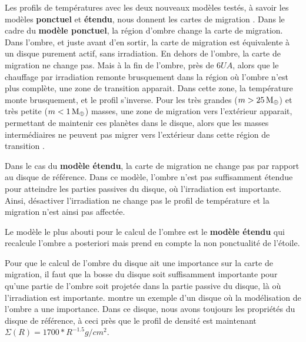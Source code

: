 Les profils de températures avec les deux nouveaux modèles testés, à savoir les modèles \textbf{ponctuel} et \textbf{étendu},
nous donnent les cartes de migration . Dans le cadre du \textbf{modèle ponctuel}, la région
d'ombre change la carte de migration. Dans l'ombre, et juste avant d'en sortir, la carte de migration est équivalente à un
disque purement actif, sans irradiation. En dehors de l'ombre, la carte de migration ne change pas. Mais à la fin de l'ombre,
près de $6\unit{UA}$, alors que le chauffage par irradiation remonte brusquement dans la région où l'ombre n'est plus
complète, une zone de transition apparait. Dans cette zone, la température monte brusquement, et le profil s'inverse. Pour les
très grandes ($m>25\mathrm{\thinspace M_\oplus}$) et très petite ($m<1\mathrm{\thinspace M_\oplus}$) masses, une zone de migration vers l'extérieur apparait, permettant
de maintenir ces planètes dans le disque, alors que les masses intermédiaires ne peuvent pas migrer vers l'extérieur dans cette
région de transition . 

Dans le cas du \textbf{modèle étendu}, la carte de migration ne change pas par rapport au disque de référence. Dans ce modèle, l'ombre n'est pas suffisamment étendue pour atteindre les parties passives du disque, où l'irradiation est importante. Ainsi, désactiver l'irradiation ne change pas le profil de température et la migration n'est ainsi pas affectée. 

Le modèle le plus abouti pour le calcul de l'ombre est le \textbf{modèle étendu} qui recalcule l'ombre a posteriori mais prend en compte la non ponctualité de l'étoile. 

Pour que le calcul de l'ombre du disque ait une importance sur la carte de migration, il faut que la bosse du disque soit suffisamment importante pour qu'une partie de l'ombre soit projetée dans la partie passive du disque, là où l'irradiation est importante.  montre un exemple d'un disque où la modélisation de l'ombre a une importance. Dans ce disque, nous avons toujours les propriétés du disque de référence, à ceci près que le profil de densité est maintenant $\Sigma(R) = 1700 * R^{-1.5}\unit{g/cm^2}$. 

